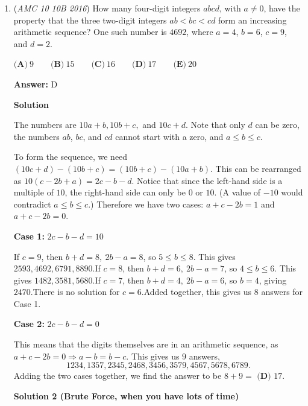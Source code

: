 \begin{enumerate}
 Substituting this into equation $(3)$:
 \[[WCXYFZ] = \frac{27p^2\sqrt{3}}{2} - 2(4p^2\sqrt{3}) = \frac{27p^2\sqrt{3}}{2} - 8p^2\sqrt{3} = \frac{11p^2\sqrt{3}}{2}\]

 Finally, we find the required ratio:
 \[\frac{[WCXYFZ]}{[ABCDEF]} = \frac{\frac{11p^2\sqrt{3}}{2}}{\frac{27p^2\sqrt{3}}{2}} = \frac{11}{27}\]



	\item (\textit{AMC 10 10B 2016}) How many four-digit integers $abcd$, with $a \neq 0$, have the property that the three two-digit integers $ab<bc<cd$ form an increasing arithmetic sequence? One such number is $4692$, where $a=4$, $b=6$, $c=9$, and $d=2$.


 $\textbf{(A)}\ 9\qquad\textbf{(B)}\ 15\qquad\textbf{(C)}\ 16\qquad\textbf{(D)}\ 17\qquad\textbf{(E)}\ 20$

 \textbf{Answer: }D



\textbf{Solution}

The numbers are $10a+b, 10b+c,$ and $10c+d$. Note that only $d$ can be zero, the numbers $ab$, $bc$, and $cd$ cannot start with a zero, and $a\le b\le c$.

 To form the sequence, we need $(10c+d)-(10b+c)=(10b+c)-(10a+b)$. This can be rearranged as $10(c-2b+a)=2c-b-d$. Notice that since the left-hand side is a multiple of $10$, the right-hand side can only be $0$ or $10$. (A value of $-10$ would contradict $a\le b\le c$.) Therefore we have two cases: $a+c-2b=1$ and $a+c-2b=0$.

 \textbf{Case 1:} $2c-b-d=10$

 If $c=9$, then $b+d=8,\ 2b-a=8$, so $5\le b\le 8$. This gives $2593, 4692, 6791, 8890$.If $c=8$, then $b+d=6,\ 2b-a=7$, so $4\le b\le 6$. This gives $1482, 3581, 5680$.If $c=7$, then $b+d=4,\ 2b-a=6$, so $b=4$, giving $2470$.There is no solution for $c=6$.Added together, this gives us $8$ answers for Case 1.

 


 \textbf{Case 2:} $2c-b-d=0$

 This means that the digits themselves are in an arithmetic sequence, as $a+c-2b=0 \Rightarrow a-b=b-c.$ This gives us $9$ answers,
 \[1234, 1357, 2345, 2468, 3456, 3579, 4567, 5678, 6789.\]Adding the two cases together, we find the answer to be $8+9=$ $\boxed{\textbf{(D) }17}$.

 



\textbf{Solution 2 (Brute Force, when you have lots of time)}


\end{enumerate}
